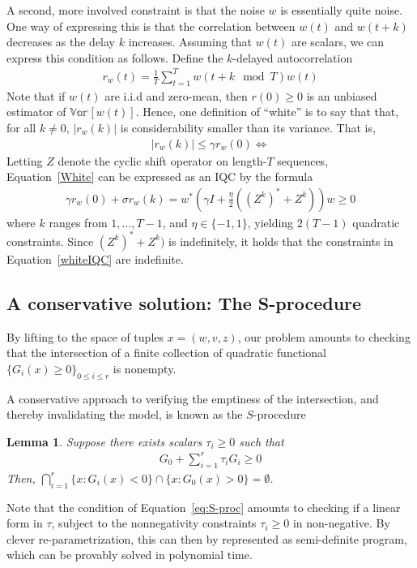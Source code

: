 \documentclass[11pt]{article} %
\theoremstyle{plain}
\newtheorem{lem}[thm]{Lemma}
\theoremstyle{definition}
\theoremstyle{remark}
\begin{document}
A second, more involved constraint is that the noise $w$ is essentially quite noise. One way of expressing this is that the correlation between $w(t)$ and $w(t+k)$ decreases as the delay $k$ increases. Assuming that $w(t)$ are scalars, we can express this condition as follows. Define the $k$-delayed autocorrelation
\begin{eqnarray}
r_w(t) = \frac{1}{T}\sum_{t=1}^{T} w(t + k \mod T)w(t)
\end{eqnarray}
Note that if $w(t)$ are i.i.d and zero-mean, then $r(0) \ge 0$ is an unbiased estimator of $\mathbb{Var}[w(t)]$. Hence, one definition of ``white'' is to say that that, for all $k \ne 0$, $|r_w(k)|$ is considerability smaller than its variance. That is,
\begin{eqnarray}\label{White}
|r_w(k)| \le \gamma r_w(0) \iff 
\end{eqnarray}
Letting $Z$ denote the cyclic shift operator on length-$T$ sequences, Equation~\ref{White} can be expressed as an IQC by the formula
\begin{eqnarray}\label{whiteIQC}
\gamma r_w(0) + \sigma r_w(k) = w^*(\gamma I + \frac{\eta}{2}((Z^k)^* + Z^k))w  \ge 0
\end{eqnarray}
where $k$ ranges from $1,\dots,T-1$, and $\eta \in \{-1,1\}$, yielding $2(T-1)$ quadratic constraints. Since $(Z^k)^* + Z^k)$ is indefinitely, it holds that the constraints in Equation~\ref{whiteIQC} are indefinite.

\subsection{A conservative solution: The S-procedure}
By lifting to the space of tuples $x = (w,v,z)$, our problem amounts to checking that the intersection of a finite collection of quadratic functional $\{G_i(x) \ge 0\}_{0 \le i \le r}$ is nonempty.  

A conservative approach to verifying the emptiness of the intersection, and thereby invalidating the model, is known as the $S$-procedure
\begin{lem} Suppose there exists scalars $\tau_i \ge 0$ such that
\begin{eqnarray}\label{eq:S-proc}
G_0 + \sum_{i=1}^r \tau_i G_i \ge 0
\end{eqnarray} Then, $\bigcap_{i=1}^r\{x:G_i(x) < 0\}\cap \{x: G_0(x) > 0\} =\emptyset$. 
\end{lem}
Note that the condition of Equation~\ref{eq:S-proc} amounts to checking if a linear form in $\tau$, subject to the nonnegativity constraints $\tau_i \ge 0$ in non-negative. By clever re-parametrization, this can then by represented as semi-definite program, which can be provably solved in polynomial time. 
\end{document}
